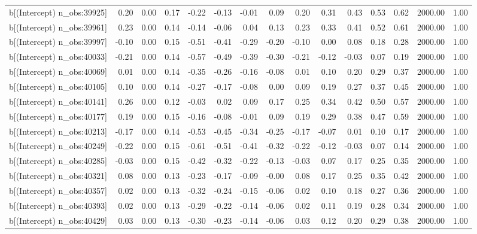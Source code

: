 \begin{table}[ht]
\begin{tabular}{rrrrrrrrrrrrrrr}
  b[(Intercept) n\_obs:39925] & 0.20 & 0.00 & 0.17 & -0.22 & -0.13 & -0.01 & 0.09 & 0.20 & 0.31 & 0.43 & 0.53 & 0.62 & 2000.00 & 1.00 \\ 
  b[(Intercept) n\_obs:39961] & 0.23 & 0.00 & 0.14 & -0.14 & -0.06 & 0.04 & 0.13 & 0.23 & 0.33 & 0.41 & 0.52 & 0.61 & 2000.00 & 1.00 \\ 
  b[(Intercept) n\_obs:39997] & -0.10 & 0.00 & 0.15 & -0.51 & -0.41 & -0.29 & -0.20 & -0.10 & 0.00 & 0.08 & 0.18 & 0.28 & 2000.00 & 1.00 \\ 
  b[(Intercept) n\_obs:40033] & -0.21 & 0.00 & 0.14 & -0.57 & -0.49 & -0.39 & -0.30 & -0.21 & -0.12 & -0.03 & 0.07 & 0.19 & 2000.00 & 1.00 \\ 
  b[(Intercept) n\_obs:40069] & 0.01 & 0.00 & 0.14 & -0.35 & -0.26 & -0.16 & -0.08 & 0.01 & 0.10 & 0.20 & 0.29 & 0.37 & 2000.00 & 1.00 \\ 
  b[(Intercept) n\_obs:40105] & 0.10 & 0.00 & 0.14 & -0.27 & -0.17 & -0.08 & 0.00 & 0.09 & 0.19 & 0.27 & 0.37 & 0.45 & 2000.00 & 1.00 \\ 
  b[(Intercept) n\_obs:40141] & 0.26 & 0.00 & 0.12 & -0.03 & 0.02 & 0.09 & 0.17 & 0.25 & 0.34 & 0.42 & 0.50 & 0.57 & 2000.00 & 1.00 \\ 
  b[(Intercept) n\_obs:40177] & 0.19 & 0.00 & 0.15 & -0.16 & -0.08 & -0.01 & 0.09 & 0.19 & 0.29 & 0.38 & 0.47 & 0.59 & 2000.00 & 1.00 \\ 
  b[(Intercept) n\_obs:40213] & -0.17 & 0.00 & 0.14 & -0.53 & -0.45 & -0.34 & -0.25 & -0.17 & -0.07 & 0.01 & 0.10 & 0.17 & 2000.00 & 1.00 \\ 
  b[(Intercept) n\_obs:40249] & -0.22 & 0.00 & 0.15 & -0.61 & -0.51 & -0.41 & -0.32 & -0.22 & -0.12 & -0.03 & 0.07 & 0.14 & 2000.00 & 1.00 \\ 
  b[(Intercept) n\_obs:40285] & -0.03 & 0.00 & 0.15 & -0.42 & -0.32 & -0.22 & -0.13 & -0.03 & 0.07 & 0.17 & 0.25 & 0.35 & 2000.00 & 1.00 \\ 
  b[(Intercept) n\_obs:40321] & 0.08 & 0.00 & 0.13 & -0.23 & -0.17 & -0.09 & -0.00 & 0.08 & 0.17 & 0.25 & 0.35 & 0.42 & 2000.00 & 1.00 \\ 
  b[(Intercept) n\_obs:40357] & 0.02 & 0.00 & 0.13 & -0.32 & -0.24 & -0.15 & -0.06 & 0.02 & 0.10 & 0.18 & 0.27 & 0.36 & 2000.00 & 1.00 \\ 
  b[(Intercept) n\_obs:40393] & 0.02 & 0.00 & 0.13 & -0.29 & -0.22 & -0.14 & -0.06 & 0.02 & 0.11 & 0.19 & 0.28 & 0.34 & 2000.00 & 1.00 \\ 
  b[(Intercept) n\_obs:40429] & 0.03 & 0.00 & 0.13 & -0.30 & -0.23 & -0.14 & -0.06 & 0.03 & 0.12 & 0.20 & 0.29 & 0.38 & 2000.00 & 1.00 \\ 

\end{tabular}
\end{table}

